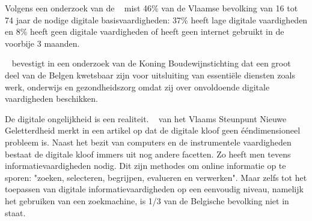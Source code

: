 




Volgens een onderzoek van de ~\textcite{VlaamseVeerkracht} mist 46\% van de Vlaamse bevolking van 16 tot 74 jaar de nodige digitale basisvaardigheden: 37\% heeft lage digitale vaardigheden en 8\% heeft geen digitale vaardigheden of heeft geen internet gebruikt in de voorbije 3 maanden.

~\textcite{DigitaleInclusieBarometer} bevestigt in een onderzoek van de Koning Boudewijnstichting dat een groot deel van de Belgen kwetsbaar zijn voor uitsluiting van essentiële diensten zoals werk, onderwijs en gezondheidszorg omdat zij over onvoldoende digitale vaardigheden beschikken.

De digitale ongelijkheid is een realiteit. ~\textcite{IedereenDigitaleKloof} van het Vlaams Steunpunt Nieuwe Geletterdheid merkt in een artikel op dat de digitale kloof geen ééndimensioneel probleem is. \indent Naast het bezit van computers en de instrumentele vaardigheden bestaat de digitale kloof immers uit nog andere facetten. Zo heeft men tevens informatievaardigheden nodig. Dit zijn methodes om online informatie op te sporen: "zoeken, selecteren, begrijpen, evalueren en verwerken". Maar zelfs tot het toepassen van digitale informatievaardigheden op een eenvoudig niveau, namelijk het gebruiken van een zoekmachine, is 1/3 van de Belgische bevolking niet in staat.

